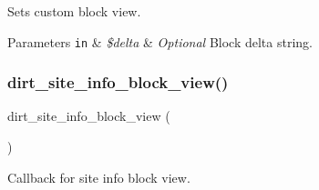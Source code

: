 Sets custom block view.


\begin{DoxyParams}[1]{Parameters}
\mbox{\tt in}  & {\em \$delta} & {\itshape Optional} Block delta string. \\
\hline
\end{DoxyParams}
\mbox{\label{dirt_8blocks_8inc_aac441ea675cae18dfad56cfab9911016}} 
\subsubsection{\texorpdfstring{dirt\+\_\+site\+\_\+info\+\_\+block\+\_\+view()}{dirt\_site\_info\_block\_view()}}
{\footnotesize\ttfamily dirt\+\_\+site\+\_\+info\+\_\+block\+\_\+view (\begin{DoxyParamCaption}{ }\end{DoxyParamCaption})}

Callback for site info block view. 